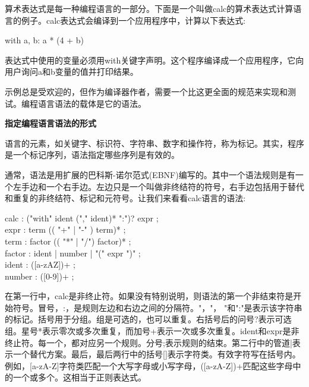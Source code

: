 算术表达式是每一种编程语言的一部分。下面是一个叫做calc的算术表达式计算语言的例子。calc表达式会编译到一个应用程序中，计算以下表达式:\par

\begin{tcolorbox}[colback=white,colframe=black]
with a, b: a * (4 + b)
\end{tcolorbox}

表达式中使用的变量必须用with关键字声明。这个程序编译成一个应用程序，它向用户询问a和b变量的值并打印结果。\par

示例总是受欢迎的，但作为编译器作者，需要一个比这更全面的规范来实现和测试。编程语言语法的载体是它的语法。\par

\hspace*{\fill} \par %
\textbf{指定编程语言语法的形式}

语言的元素，如关键字、标识符、字符串、数字和操作符，称为标记。其实，程序是一个标记序列，语法指定哪些序列是有效的。\par

通常，语法是用扩展的巴科斯-诺尔范式(EBNF)编写的。其中一个语法规则是有一个左手边和一个右手边。左边只是一个叫做非终结符的符号，右手边包括用于替代和重复的非终结符、标记和元符号。让我们来看看calc语言的语法:\par

\begin{tcolorbox}[colback=white,colframe=black]
calc : ("with" ident ("," ident)* ":")? expr ; \\
expr : term (( "+" | "-" ) term)* ; \\
term : factor (( "*" | "/") factor)* ; \\
factor : ident | number | "(" expr ")" ; \\
ident : ([a-zAZ])+ ; \\
number : ([0-9])+ ; 
\end{tcolorbox}

在第一行中，calc是非终止符。如果没有特别说明，则语法的第一个非结束符是开始符号。冒号，:，是规则左边和右边之间的分隔符。"，"， "和":"是表示该字符串的标记。括号用于分组。组是可选的，也可以重复。右括号后的问号?表示可选组。星号*表示零次或多次重复，而加号+表示一次或多次重复。ident和expr是非终止符。每一个，都对应另一个规则。分号;表示规则的结束。第二行中的管道|表示一个替代方案。最后，最后两行中的括号[]表示字符类。有效字符写在括号内。例如，[a-zA-Z]字符类匹配一个大写字母或小写字母，([a-zA-Z])+匹配这些字母中的一个或多个。这相当于正则表达式。\par

